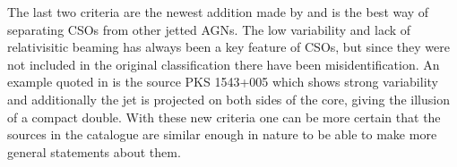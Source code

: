 The last two criteria are the newest addition made by \cite{kiehlmann2023compact} and is the best way of separating CSOs from other jetted AGNs. The low variability and lack of relativisitic beaming has always been a key feature of CSOs, but since they were not included in the original classification there have been misidentification. An example quoted in \cite{kiehlmann2023compact} is the source PKS 1543+005 which shows strong variability and additionally the jet is projected on both sides of the core, giving the illusion of a compact double. With these new criteria one can be more certain that the sources in the catalogue are similar enough in nature to be able to make more general statements about them.














